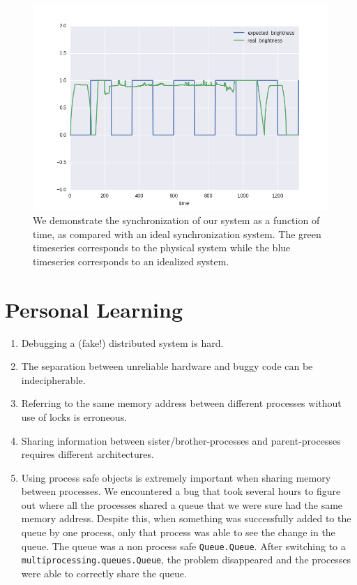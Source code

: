 \documentclass[preprint,review,12pt]{cs262}
\begin{document}
\begin{figure}[h]
  \centering
  \includegraphics[width=\textwidth]{figures/results}
  \caption{We demonstrate the synchronization of our system as a function of time, as compared with an ideal synchronization system. The green timeseries corresponds to the physical system while the blue timeseries corresponds to an idealized system. 
 \label{fig:res}}
\end{figure}

\section{Personal Learning} 


\begin{enumerate}
\item Debugging a (fake!) distributed system is hard. 

\item The separation between unreliable hardware and buggy code can be indecipherable. 

\item Referring to the same memory address between different processes without use of locks is erroneous. 

\item Sharing information between sister/brother-processes and parent-processes requires different architectures. 

\item Using process safe objects is extremely important when sharing memory between processes.
We encountered a bug that took several hours to figure out where all the processes shared a queue that we were sure had the same memory address. Despite this, when something was successfully added to the queue by one process, only that process was able to see the change in the queue. The queue was a non process safe \texttt{Queue.Queue}. After switching to a \texttt{multiprocessing.queues.Queue}, the problem disappeared and the processes were able to correctly share the queue.
\end{enumerate}
\end{document}
